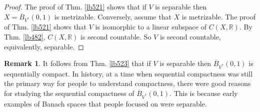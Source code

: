 \documentclass[12pt,b5paper,notitlepage]{article}
\theoremstyle{definition}
\newtheorem{rem}[df]{Remark}
\theoremstyle{plain}
\newcommand{\ovl}{\overline}
\newcommand{\Rbb}{\mathbb R}
\numberwithin{equation}{section}
\begin{document}
\begin{proof}
The proof of Thm. \ref{lb521} shows that if $V$ is separable then $X=\ovl B_{V^*}(0,1)$ is metrizable. Conversely, assume that $X$ is metrizable. The proof of Thm. \ref{lb521} shows that $V$ is isomorphic to a linear subspace of $C(X,\Rbb)$. By Thm. \ref{lb482}, $C(X,\Rbb)$ is second countable. So $V$ is second countable, equivalently, separable.
\end{proof}

\begin{rem}
It follows from Thm. \ref{lb523} that if $V$ is separable then $\ovl B_{V^*}(0,1)$ is sequentially compact. In history, at a time when sequential compactness was still the primary way for people to understand compactness, there were good reasons for studying the sequential compactness of $\ovl B_{V^*}(0,1)$. This is because early examples of Banach spaces that people focused on were separable. 
\end{rem}
\end{document}
